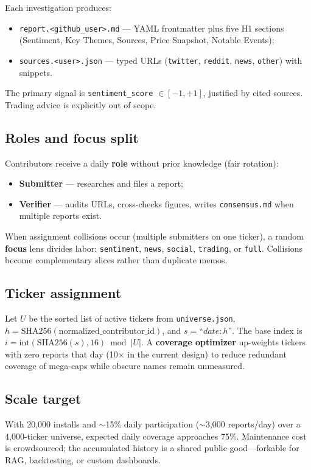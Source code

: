 \documentclass[conference]{IEEEtran}
\begin{document}
Each investigation produces:
\begin{itemize}
  \item \texttt{report.<github\_user>.md} --- YAML frontmatter plus five H1 sections (Sentiment, Key Themes, Sources, Price Snapshot, Notable Events);
  \item \texttt{sources.<user>.json} --- typed URLs (\texttt{twitter}, \texttt{reddit}, \texttt{news}, \texttt{other}) with snippets.
\end{itemize}

The primary signal is \texttt{sentiment\_score} $\in [-1, +1]$, justified by cited sources.
Trading advice is explicitly out of scope.

\subsection{Roles and focus split}
Contributors receive a daily \textbf{role} without prior knowledge (fair rotation):
\begin{itemize}
  \item \textbf{Submitter} --- researches and files a report;
  \item \textbf{Verifier} --- audits URLs, cross-checks figures, writes \texttt{consensus.md} when multiple reports exist.
\end{itemize}

When assignment collisions occur (multiple submitters on one ticker), a random \textbf{focus} lens divides labor: \texttt{sentiment}, \texttt{news}, \texttt{social}, \texttt{trading}, or \texttt{full}.
Collisions become complementary slices rather than duplicate memos.

\subsection{Ticker assignment}
Let $U$ be the sorted list of active tickers from \texttt{universe.json}, $h = \text{SHA256}(\text{normalized\_contributor\_id})$, and $s = \text{``}\textit{date}:h\text{''}$.
The base index is $i = \text{int}(\text{SHA256}(s), 16) \bmod |U|$.
A \textbf{coverage optimizer} up-weights tickers with zero reports that day (10$\times$ in the current design) to reduce redundant coverage of mega-caps while obscure names remain unmeasured.

\subsection{Scale target}
With 20{,}000 installs and $\sim$15\% daily participation ($\sim$3{,}000 reports/day) over a 4{,}000-ticker universe, expected daily coverage approaches 75\%.
Maintenance cost is crowdsourced; the accumulated history is a shared public good---forkable for RAG, backtesting, or custom dashboards.
\end{document}
